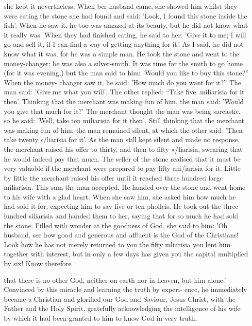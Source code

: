 she kept it nevertheless, When ber husband came, she showed him
whilst they were eating the stone she had found and said: 'Look, I
found this stone inside the fish'. When he saw it, he too was amazed
at its beauty, but he did not know what it really was. When they
had finished eating, he said to her: 'Give it to me; I will go and sell
it, if I can find a way of getting anything for it'. As I said, he did
not know what it was, for he was a simple man. He took the stone
and went to the money-changer; he was also a silver-smith. It was
time for the smith to go home (for it was evening,) but the man said
to him: 'Would you like to buy this stone?” When the money-
changer saw it, he said: 'How much do you want for it?” The man
said: 'Give me what you will', The other replied: “Take five
.miliarisia for it then'. Thinking that the merchant was making fun
of him, the man said: 'Would you give that much for it?' The
merchant thought the man was being sarcastic, so he said: 'Well,
take ten miliarisia for it then', Still thinking that the merchant was
making fun of him, the man remained silent, at which the other
said: 'Then take twenty s/liarisia for it'. As the man still kept silent
and made no response, the merchant raised his offer to thirty, and
then to fifty «/liarisia, swearing that he would indeed pay that
much. The seller of the stone realised that it must be very valuable
if the merchant were prepared to pay fifty ani/iarisia for it. Little by
little the merchant raised his offer until it reached three hundred
large miliarisia. This sum the man accepted. He handed over the
stone and went home to his wife with a glad heart. When she saw
him, she asked him how much he had sold it for, expecting him to
say five or ten pholleis, He took out the three-lundred siliarisia
and handed them to her, saying that for so much he had sold the
stone. Filled with wonder at the goodness of God, she said to him:
'Oh husband, see how good and generous and affluent is the God
of the Christians! Look how he has not merely returned to you the
fifty mliarisia you lent him together with interest, but in only a few
days has given you the capital multiplied by six! Know therefore

that there is no other God, neither on earth nor in heaven, but him
alone.' Convinced by this miracle and learning the truth by experi-
ence, he immediately became a Christian and glorified our God and
Saviour, Jesus Christ, with the Father and the Holy Spirit, gratefully
acknowledging the intelligence of his wife by which it had been
granted to him to know God in very truth,

